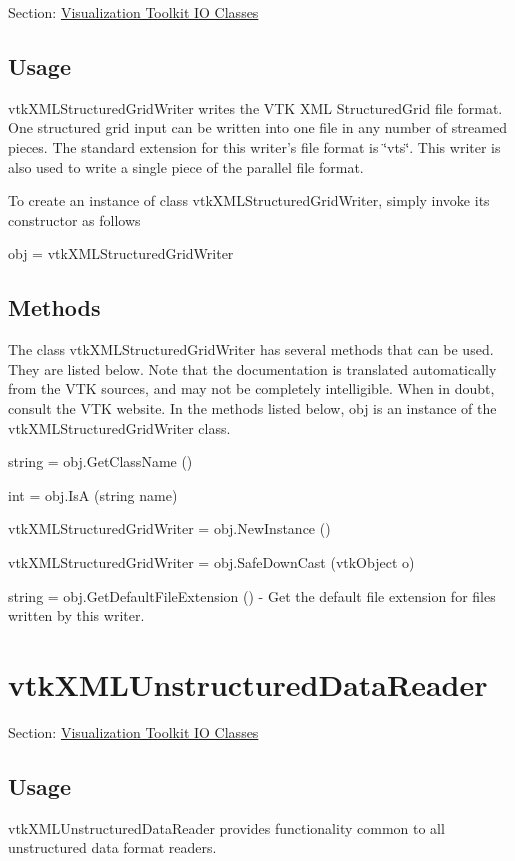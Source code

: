 Section\-: \hyperlink{sec_vtkio}{Visualization Toolkit I\-O Classes} \hypertarget{vtkwidgets_vtkxyplotwidget_Usage}{}\subsection{Usage}\label{vtkwidgets_vtkxyplotwidget_Usage}
vtk\-X\-M\-L\-Structured\-Grid\-Writer writes the V\-T\-K X\-M\-L Structured\-Grid file format. One structured grid input can be written into one file in any number of streamed pieces. The standard extension for this writer's file format is \char`\"{}vts\char`\"{}. This writer is also used to write a single piece of the parallel file format.

To create an instance of class vtk\-X\-M\-L\-Structured\-Grid\-Writer, simply invoke its constructor as follows \begin{DoxyVerb}  obj = vtkXMLStructuredGridWriter
\end{DoxyVerb}
 \hypertarget{vtkwidgets_vtkxyplotwidget_Methods}{}\subsection{Methods}\label{vtkwidgets_vtkxyplotwidget_Methods}
The class vtk\-X\-M\-L\-Structured\-Grid\-Writer has several methods that can be used. They are listed below. Note that the documentation is translated automatically from the V\-T\-K sources, and may not be completely intelligible. When in doubt, consult the V\-T\-K website. In the methods listed below, {\ttfamily obj} is an instance of the vtk\-X\-M\-L\-Structured\-Grid\-Writer class. 
\begin{DoxyItemize}
\item {\ttfamily string = obj.\-Get\-Class\-Name ()}  
\item {\ttfamily int = obj.\-Is\-A (string name)}  
\item {\ttfamily vtk\-X\-M\-L\-Structured\-Grid\-Writer = obj.\-New\-Instance ()}  
\item {\ttfamily vtk\-X\-M\-L\-Structured\-Grid\-Writer = obj.\-Safe\-Down\-Cast (vtk\-Object o)}  
\item {\ttfamily string = obj.\-Get\-Default\-File\-Extension ()} -\/ Get the default file extension for files written by this writer.  
\end{DoxyItemize}\hypertarget{vtkio_vtkxmlunstructureddatareader}{}\section{vtk\-X\-M\-L\-Unstructured\-Data\-Reader}\label{vtkio_vtkxmlunstructureddatareader}
Section\-: \hyperlink{sec_vtkio}{Visualization Toolkit I\-O Classes} \hypertarget{vtkwidgets_vtkxyplotwidget_Usage}{}\subsection{Usage}\label{vtkwidgets_vtkxyplotwidget_Usage}
vtk\-X\-M\-L\-Unstructured\-Data\-Reader provides functionality common to all unstructured data format readers.

